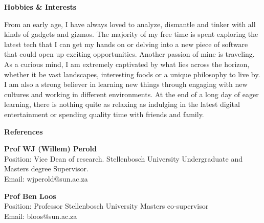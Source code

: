 \documentclass[a4paper,12pt,final]{memoir}
\newcommand{\Sep}{\vspace{1.5em}}
\newcommand{\SmallSep}{\vspace{0.5em}}
\newcommand{\CVSection}[1]
	{\Large\textbf{#1}\par
	\SmallSep\normalsize\normalfont}
\newcommand{\CVItem}[1]
	{\textbf{\color{RoyalBlue} #1}}
\begin{document}
\Sep 
\CVSection{Hobbies \& Interests}
From an early age, I have always loved to analyze, dismantle and tinker with all kinds of gadgets and gizmos. The majority of my free time is spent exploring the latest tech that I can get my hands on or delving into a new piece of software that could open up exciting opportunities. Another passion of mine is traveling. As a curious mind, I am extremely captivated by what lies across the horizon, whether it be vast landscapes, interesting foods or a unique philosophy to live by. I am also a strong believer in learning new things through engaging with new cultures and working in different environments. At the end of a long day of eager learning, there is nothing quite as relaxing as indulging in the latest digital entertainment or spending quality time with friends and family.      

\Sep 
\CVSection{References}

	\begin{compactitem}[\color{RoyalBlue}$\circ$]
		\item \CVItem{Prof WJ (Willem) Perold}\\Position: Vice Dean of research. Stellenbosch University Undergraduate and Masters degree Supervisor.\\Email: wjperold@sun.ac.za
		\item \CVItem{Prof Ben Loos}\\Position: Professor Stellenbosch University  Masters co-supervisor\\Email: bloos@sun.ac.za
	\end{compactitem}


\end{document}
